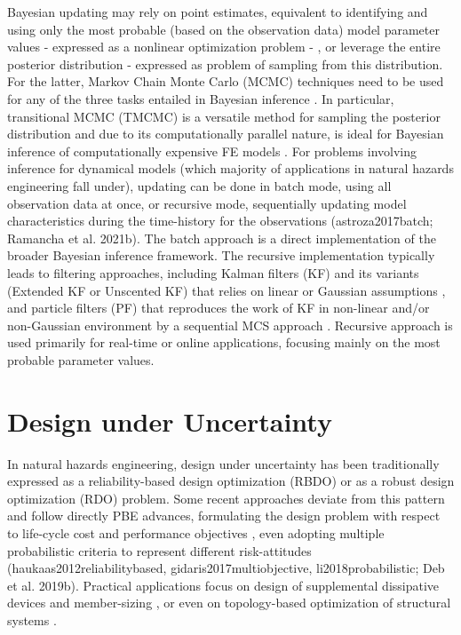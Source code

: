 Bayesian updating may rely on point estimates, equivalent to identifying and using only the most probable (based on the observation data) model parameter values - expressed as a nonlinear optimization problem - , or leverage the entire posterior distribution - expressed as problem of sampling from this distribution. For the latter, Markov Chain Monte Carlo (MCMC) techniques need to be used for any of the three tasks entailed in Bayesian inference \citep{catanach2018bayesian}. In particular, transitional MCMC (TMCMC) is a versatile method for sampling the posterior distribution \citep{ching2007transitional,betz2016transitional} and due to its computationally parallel nature, is ideal for Bayesian inference of computationally expensive FE models \citep{ramancha2021bayesian, ramancha2021bayesianupdating}. For problems involving inference for dynamical models (which majority of applications in natural hazards engineering fall under), updating can be done in batch mode, using all observation data at once, or recursive mode, sequentially updating model characteristics during the time-history for the observations (astroza2017batch; Ramancha et al. 2021b). The batch approach is a direct implementation of the broader Bayesian inference framework. The recursive implementation typically leads to filtering approaches, including Kalman filters (KF) and its variants (Extended KF or Unscented KF) that relies on linear or Gaussian assumptions \citep{astroza2017batch,kontoroupi2017online,erazo2018bayesian}, and particle filters (PF) that reproduces the work of KF in non-linear and/or non-Gaussian environment by a sequential MCS approach \citep{chatzi2009unscented, wei2013dynamic, olivier2017particle}. Recursive approach is used primarily for real-time or online applications, focusing mainly on the most probable parameter values. 

\section{Design under Uncertainty}
\label{sec:uq_design}

In natural hazards engineering, design under uncertainty has been traditionally expressed as a reliability-based design optimization (RBDO) \citep{spence2012large, chun2019systemreliabilitybased} or as a robust design optimization (RDO) \citep{greco2015robust} problem. Some recent approaches deviate from this pattern and follow directly PBE advances, formulating the design problem with respect to life-cycle cost and performance objectives \citep{shin2014minimum}, even adopting multiple probabilistic criteria to represent different risk-attitudes (haukaas2012reliabilitybased, gidaris2017multiobjective, li2018probabilistic; Deb et al. 2019b). Practical applications focus on design of supplemental dissipative devices \citep{shin2014minimum, gidaris2017multiobjective, altieri2018reliabilitybased} and member-sizing \citep{huang2015performancebased, suksuwan2018optimization}, or even on topology-based optimization of structural systems \citep{bobby2017reliabilitybased, zhu2017topology}.

